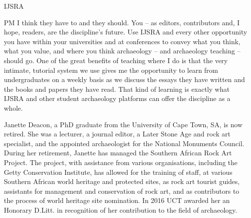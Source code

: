 \documentclass[%
	]{ijsra}
\begin{document}
\begin{labeling}{IJSRA}
\item[PM]I think they have to and they should. You – as editors, contributors and, I hope, readers, are the discipline’s future. Use IJSRA and every other opportunity you have within your universities and at conferences to convey what you think, what you value, and where you think archaeology – and archaeology teaching – should go. One of the great benefits of teaching where I do is that the very intimate, tutorial system we use gives me the opportunity to learn from undergraduates on a weekly basis as we discuss the essays they have written and the books and papers they have read. That kind of learning is exactly what IJSRA and other student archaeology platforms can offer the discipline as a whole.
\end{labeling}
\IJSRAseparator
{}
{\sffamily Janette Deacon, a PhD graduate from the University of Cape Town, SA, is now retired. She was a lecturer, a journal editor, a Later Stone Age and rock art specialist, and the appointed archaeologist for the National Monuments Council. During her retirement, Janette has managed the Southern African Rock Art Project. The project, with assistance from various organisations, including the Getty Conservation Institute, has allowed for the training of  staff, at various Southern African world heritage and protected sites, as rock art tourist guides, assistants for management and conservation of rock art, and as contributors to the process of world heritage site nomination. In 2016 UCT awarded her an Honorary D.Litt. in recognition of her contribution to the field of archaeology.}
\end{document}
